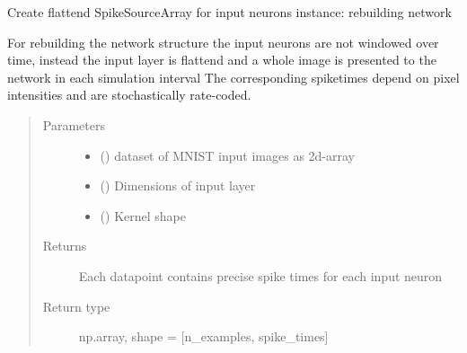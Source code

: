 \documentclass[letterpaper,10pt,english]{sphinxmanual}
\begin{document}
\begin{fulllineitems}
\label{\detokenize{SpikingConvNet:SpikingConvNet.algorithms.input_flattend_spikes}}
Create flattend SpikeSourceArray for input neurons
instance: rebuilding network

For rebuilding the network structure the input neurons are not windowed
over time, instead the input layer is flattend and a whole image is
presented to the network in each simulation interval
The corresponding spiketimes depend on pixel intensities and are
stochastically rate-coded.
\begin{quote}\begin{description}
\item[{Parameters}] \leavevmode\begin{itemize}
\item {} 
 () \textendash{} dataset of MNIST input images as 2d-array

\item {} 
 () \textendash{} Dimensions of input layer

\item {} 
 () \textendash{} Kernel shape

\end{itemize}

\item[{Returns}] \leavevmode
{} \textendash{} Each datapoint contains precise spike times for each input neuron

\item[{Return type}] \leavevmode
np.array, shape = {[}n\_examples, spike\_times{]}

\end{description}\end{quote}

\end{fulllineitems}

\end{document}
